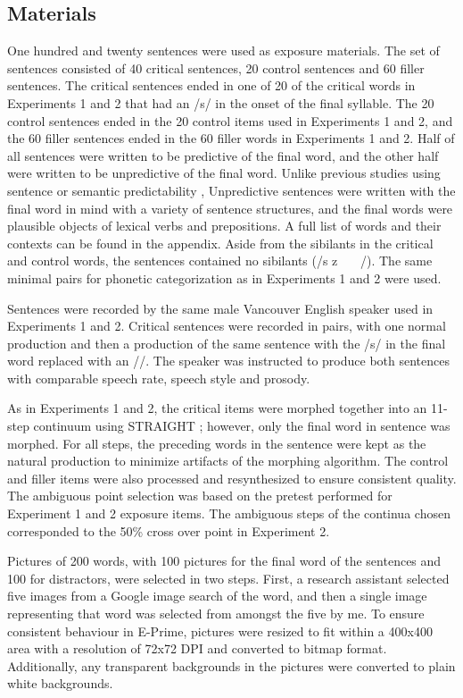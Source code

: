 \subsection{Materials}

One hundred and twenty sentences were used as exposure materials.  
The set of sentences consisted of 40 critical sentences, 20 control sentences and 60 filler sentences. 
The critical sentences ended in one of 20 of the critical words in Experiments 1 and 2 that had an /s/ in the onset of the final syllable.  
The 20 control sentences ended in the 20 control items used in Experiments 1 and 2, and the 60 filler sentences ended in the 60 filler words in Experiments 1 and 2.  
Half of all sentences were written to be predictive of the final word, and the other half were written to be unpredictive of the final word.  
Unlike previous studies using sentence or semantic predictability \citep{Kalikow1977}, Unpredictive sentences were written with the final word in mind with a variety of sentence structures, and the final words were plausible objects of lexical verbs and prepositions.  
A full list of words and their contexts can be found in the appendix. Aside from the sibilants in the critical and control words, the sentences contained no sibilants (/s z \textesh\ \textyogh\ \textteshlig\  \textdyoghlig/).  
The same minimal pairs for phonetic categorization as in Experiments 1 and 2 were used.

Sentences were recorded by the same male Vancouver English speaker used in Experiments 1 and 2.  
Critical sentences were recorded in pairs, with one normal production and then a production of the same sentence with the /s/ in the final word replaced with an /\textesh/.  
The speaker was instructed to produce both sentences with comparable speech rate, speech style and prosody.

As in Experiments 1 and 2, the critical items were morphed together into an 11-step continuum using STRAIGHT \citep{Kawahara2008}; however, only the final word in sentence was morphed.  
For all steps, the preceding words in the sentence were kept as the natural production to minimize artifacts of the morphing algorithm.  
The control and filler items were also processed and resynthesized to ensure consistent quality.  The ambiguous point selection was based on the pretest performed for Experiment 1 and 2 exposure items.  
The ambiguous steps of the continua chosen corresponded to the 50\% cross over point in Experiment 2.

Pictures of 200 words, with 100 pictures for the final word of the sentences and 100 for distractors, were selected in two steps.  
First, a research assistant selected five images from a Google image search of the word, and then a single image representing that word was selected from amongst the five by me.  
To ensure consistent behaviour in E-Prime, pictures were resized to fit within a 400x400 area with a resolution of 72x72 DPI and converted to bitmap format.  
Additionally, any transparent backgrounds in the pictures were converted to plain white backgrounds.

